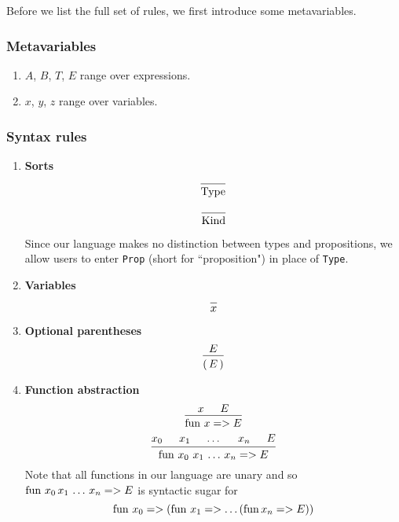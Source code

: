 \documentclass{article}
\begin{document}
Before we list the full set of rules, we first introduce some metavariables.

\subsubsection{Metavariables}
\begin{enumerate}
  \item $A$, $B$, $T$, $E$ range over expressions. 
  \item $x$, $y$, $z$ range over variables.
\end{enumerate}

\subsubsection{Syntax rules}
\begin{enumerate}
\item \textbf{Sorts} \\
  \[
    \begin{prooftree}
      \infer0{\Type}
    \end{prooftree}
  \]

  \[
    \begin{prooftree}
      \infer0{\Kind}
    \end{prooftree}
  \]

  Since our language makes no distinction between types and propositions,
  we allow users to enter \verb|Prop| (short for ``proposition") in place of 
  \verb|Type|.

\item \textbf{Variables} \\
  \[
    \begin{prooftree}
      \infer0{x}
    \end{prooftree}
  \]

\item \textbf{Optional parentheses} \\
  \[
    \begin{prooftree}
      \hypo{E}
      \infer1{( \, E \, )}
    \end{prooftree}
  \]
  
\item \textbf{Function abstraction} \\
  \[
    \begin{prooftree}
      \hypo{x}
      \hypo{E}
      \infer2{\fun \, x => E}
    \end{prooftree}
  \]
  \[
    \begin{prooftree}
      \hypo{x_0}
      \hypo{x_1}
      \hypo{\dots}
      \hypo{x_n}
      \hypo{E}
      \infer5{\fun \, x_0 \,\, x_1 \, \dots \, x_n => E}
    \end{prooftree}
  \]
  Note that all functions in our language are unary and so
  $\operatorname{fun} \, x_0 \, x_1 \, \dots \, x_n => E$ is syntactic sugar for
  \[ \operatorname{fun} \, x_0 => (\operatorname{fun} \, x_1 => \dots (\operatorname{fun} x_n => E)) \]


\end{enumerate}
\end{document}

